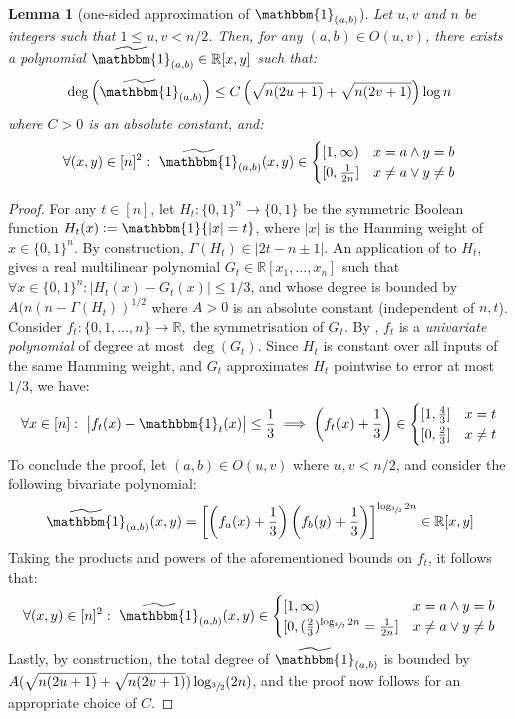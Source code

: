 \documentclass{article}
\newtheorem{lemma}[theorem]{Lemma}
\newcommand{\RR}{\mathbb{R}}
\newcommand{\eqdef}{\vcentcolon=}
\theoremstyle{remark}
\theoremstyle{plain}
\begin{document}
\begin{lemma}[one-sided approximation of $\mathbbm{1}_{(a,b)}$]
\label{lemma:approx_ind}
Let $u,v$ and $n$ be integers such that $1 \le u,v < n/2$. Then, for any $(a,b) \in O(u,v)$, there exists a polynomial $\widetilde{\mathbbm{1}}_{(a,b)} \in \RR[x,y]$ such that:
\[
    \deg \left(\widetilde{\mathbbm{1}}_{(a,b)}\right) \le C \left( \sqrt{n(2u+1)} + \sqrt{n(2v+1)}\right) \log n
\]
where $C > 0$ is an absolute constant, and:
\[
    \forall (x,y) \in [n]^2:\ \widetilde{\mathbbm{1}}_{(a,b)}(x,y) \in \begin{cases}
        [1, \infty) & x=a \land y=b \\
        [0, \frac{1}{2n}] & x \ne a \lor y \ne b
    \end{cases}
\]
\end{lemma}
\begin{proof}
    For any $t \in [n]$, let $H_t: \{0,1\}^n \to \{0,1\}$ be the symmetric Boolean function $H_t(x) \eqdef \mathbbm{1}\{ |x| = t \}$, where $|x|$ is the Hamming weight of $x \in \{0,1\}^n$. By construction, $\Gamma(H_t) \in |2t - n \pm 1|$. An application of  to $H_t$, gives a real multilinear polynomial $G_t \in \RR[x_1, \dots, x_n]$ such that $\forall x \in \{0,1\}^n: | H_t(x) - G_t(x) | \le 1/3$, and whose degree is bounded by $A (n(n - \Gamma(H_t))^{1/2}$ where $A > 0$ is an absolute constant (independent of $n,t$). Consider $f_t: \{0, 1, \dots, n\} \to \RR$, the symmetrisation of $G_t$. By , $f_t$ is a \emph{univariate polynomial} of degree at most $\deg(G_t)$. Since $H_t$ is constant over all inputs of the same Hamming weight, and $G_t$ approximates $H_t$ pointwise to error at most $1/3$, we have:
    \[
        \forall x \in [n]:\ \big| f_t(x) - \mathbbm{1}_t (x) \big| \le \frac{1}{3} \implies \left(f_t(x) + \frac{1}{3}\right) \in \begin{cases}
            [1, \frac{4}{3}] & x = t \\
            [0, \frac{2}{3}] & x \ne t
        \end{cases}
    \]
    To conclude the proof, let $(a,b) \in O(u,v)$ where $u,v < n/2$, and consider the following bivariate polynomial:
    \[
        \widetilde{\mathbbm{1}}_{(a,b)}(x,y) = \left[ \left(f_a(x) + \frac{1}{3}\right)\left(f_b(y) + \frac{1}{3}\right) \right]^{\log_{\sfrac{3}{2}}2n} \in \RR[x,y]
    \]
    Taking the products and powers of the aforementioned bounds on $f_t$, it follows that:
    \[
        \forall (x,y) \in [n]^2:\ \widetilde{\mathbbm{1}}_{(a,b)}(x,y) \in \begin{cases}
            [1, \infty) & x=a \land y=b \\
            [0, (\frac{2}{3})^{\log_{\sfrac{3}{2}}2n} = \frac{1}{2n}] & x \ne a \lor y \ne b 
        \end{cases}
    \]
    Lastly, by construction, the total degree of $\widetilde{\mathbbm{1}}_{(a,b)}$ is bounded by $A (\sqrt{n(2u+1)} + \sqrt{n(2v+1)}) \log_{\sfrac{3}{2}} (2n)$, and the proof now follows for an appropriate choice of $C$.
\end{proof}
\end{document}
